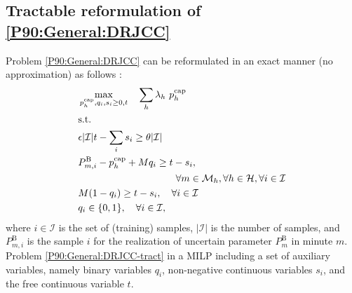 \documentclass[conference]{IEEEtran}
\begin{document}
\subsection{Tractable reformulation of \eqref{P90:General:DRJCC}} 
\vspace{-1mm}
Problem \eqref{P90:General:DRJCC} can be reformulated in an exact manner (no approximation) as follows \cite[Proposition 2]{chen2022data}:
%
\begin{subequations}\label{P90:General:DRJCC-tract}
    \begin{align}
      &  \max_{p_{h}^{\text{cap}}, q_i, s_i \geq 0, t} \quad  \sum_h \lambda_h \ p_{h}^{\text{cap}}                                                                                                                                    \\
                &\text{s.t.} \nonumber  \\
    & \epsilon |\mathcal{I}| t - \sum_{i } s_i \geq \theta |\mathcal{I}|                                                                                      \\
                                                            & P_{m,i}^{\text{B}} - p_{h}^{\text{cap}} + M q_i \geq t - s_i, \ \notag\\
                                                            & \hspace{3.5cm} \forall{m} \in \mathcal{M}_{h},  \forall{h} \in \mathcal{H},  \forall{i} \in \mathcal{I} \\
                                                            & M (1-q_i) \geq t - s_i,   \quad \forall{i}  \in \mathcal{I}                                                                                                                                            \\
                                                            & q_i \in \{0,1 \}, \quad \forall{i} \in \mathcal{I},
    \end{align}
\end{subequations}
where $i\!\in\!\mathcal{I}$ is the set of (training) samples, $|\mathcal{I}|$ is the number of samples, and $P_{m,i}^{\text{B}}$ is the sample $i$ for the realization of uncertain parameter $P_{m}^{\text{B}}$ in minute $m$. Problem \eqref{P90:General:DRJCC-tract} in a \ac{MILP} including a set of auxiliary variables, namely binary variables $q_i$, non-negative continuous variables $s_i$, and the free continuous variable $t$. 
\end{document}
